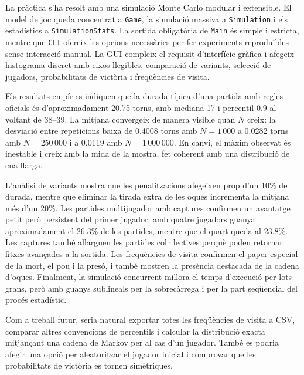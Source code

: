 \documentclass[conference,compsoc]{IEEEtran}
\begin{document}
La pràctica s'ha resolt amb una simulació Monte Carlo modular i extensible. El
model de joc queda concentrat a \texttt{Game}, la simulació massiva a
\texttt{Simulation} i els estadístics a \texttt{SimulationStats}. La sortida
obligatòria de \texttt{Main} és simple i estricta, mentre que \texttt{CLI} ofereix
les opcions necessàries per fer experiments reproduïbles sense interacció manual.
La GUI compleix el requisit d'interfície gràfica i afegeix histograma discret amb
eixos llegibles, comparació de variants, selecció de jugadors, probabilitats de
victòria i freqüències de visita.

Els resultats empírics indiquen que la durada típica d'una partida amb regles
oficials és d'aproximadament 20.75 torns, amb mediana 17 i percentil $0.9$ al
voltant de 38--39. La mitjana convergeix de manera visible quan $N$ creix: la
desviació entre repeticions baixa de 0.4008 torns amb $N=1\,000$ a 0.0282 torns amb
$N=250\,000$ i a 0.0119 amb $N=1\,000\,000$. En canvi, el màxim observat és
inestable i creix amb la mida de la mostra, fet coherent amb una distribució de cua
llarga.

L'anàlisi de variants mostra que les penalitzacions afegeixen prop d'un 10\% de
durada, mentre que eliminar la tirada extra de les oques incrementa la mitjana més
d'un 20\%. Les partides multijugador amb captures confirmen un avantatge petit però
persistent del primer jugador: amb quatre jugadors guanya aproximadament el 26.3\%
de les partides, mentre que el quart queda al 23.8\%. Les captures també allarguen
les partides col·lectives perquè poden retornar fitxes avançades a la sortida. Les
freqüències de visita confirmen el paper especial de la mort, el pou i la presó, i
també mostren la presència destacada de la cadena d'oques. Finalment, la simulació
concurrent millora el temps d'execució per lots grans, però amb guanys sublineals
per la sobrecàrrega i per la part seqüencial del procés estadístic.

Com a treball futur, seria natural exportar totes les freqüències de visita a CSV,
comparar altres convencions de percentils i calcular la distribució exacta
mitjançant una cadena de Markov per al cas d'un jugador. També es podria afegir una
opció per aleatoritzar el jugador inicial i comprovar que les probabilitats de
victòria es tornen simètriques.
\end{document}
